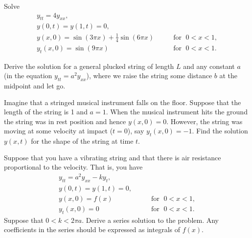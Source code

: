 \begin{exercise}
Solve
\begin{equation*}
\begin{array}{ll}
y_{tt} = 4 y_{xx} , &  \\
y(0,t) = y(1,t) = 0 , &  \\
y(x,0) = \sin (3\pi x) + \frac{1}{4} \sin (6 \pi x) & \qquad \text{for } \; 0 < x < 1 , \\
y_t(x,0) = \sin (9 \pi x) & \qquad \text{for } \; 0 < x < 1 .
\end{array}
\end{equation*}
\end{exercise}

\begin{exercise}
Derive the solution for a general plucked string of length $L$ and
any constant $a$ (in the equation $y_{tt} = a^2 y_{xx}$), where we
raise the string some distance $b$ at the midpoint and let go.
\end{exercise}

\begin{samepage}
\begin{exercise}
Imagine that a stringed musical instrument falls on the floor.  Suppose that
the length of the string is 1 and $a=1$.  When the musical instrument hits
the ground the string was in rest position and hence $y(x,0) = 0$.  However,
the string was moving at some velocity at impact ($t=0$),
say $y_t(x,0) = -1$.  Find the
solution
$y(x,t)$ for the shape of the string at time $t$.
\end{exercise}
\end{samepage}

\begin{exercise}[challenging]
Suppose that you have a vibrating string and that
there is air resistance proportional to the velocity.  That is, you have
\begin{equation*}
\begin{array}{ll}
y_{tt} = a^2 y_{xx} - k y_t , &  \\
y(0,t) = y(1,t) = 0 , &  \\
y(x,0) = f(x) & \qquad \text{for } \; 0 < x < 1 , \\
y_t(x,0) = 0 & \qquad \text{for } \; 0 < x < 1 .
\end{array}
\end{equation*}
Suppose that $0 < k < 2 \pi a$.
Derive a series solution to the problem.  Any coefficients in the series
should be expressed as integrals of $f(x)$.
\end{exercise}

